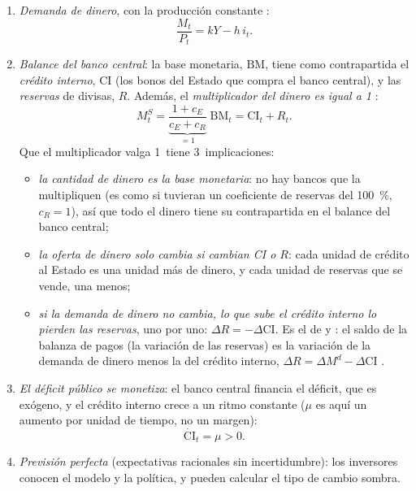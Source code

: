 \documentclass[11pt]{article}
\begin{document}
\begin{itemize}
\begin{enumerate}
\begin{equation}
    i_t=i^*+\frac{\dot E_t}{E_t} .
    \end{equation}
  \item \emph{Demanda de dinero}, con la producción constante :
    \begin{equation}\label{eq:demanda-fg}
    \frac{M_t}{P_t}=kY-h\,i_t .
    \end{equation}
  \item \emph{Balance del banco central}: la base monetaria, $\mathrm{BM}$, tiene como contrapartida el \emph{crédito interno}, CI (los bonos del Estado que compra el banco central), y las \emph{reservas} de divisas, $R$. Además, el \emph{multiplicador del dinero es igual a 1} :
    \begin{equation}\label{eq:balance-bc}
    M^S_t=\underbrace{\frac{1+c_E}{c_E+c_R}}_{=1}\;\mathrm{BM}_t=\mathrm{CI}_t+R_t .
    \end{equation}
    Que el multiplicador valga 1~tiene 3~implicaciones:
    \begin{itemize}
    \item \emph{la cantidad de dinero es la base monetaria}: no hay bancos que la multipliquen (es como si tuvieran un coeficiente de reservas del 100~\%, $c_R=1$), así que todo el dinero tiene su contrapartida en el balance del banco central;
    \item \emph{la oferta de dinero solo cambia si cambian CI o $R$}: cada unidad de crédito al Estado es una unidad más de dinero, y cada unidad de reservas que se vende, una menos;
    \item \emph{si la demanda de dinero no cambia, lo que sube el crédito interno lo pierden las reservas}, uno por uno: $\Delta R=-\Delta\mathrm{CI}$. Es el  de  y : el saldo de la balanza de pagos (la variación de las reservas) es la variación de la demanda de dinero menos la del crédito interno, $\Delta R=\Delta M^d-\Delta\mathrm{CI}$ .
    \end{itemize}
  \item \emph{El déficit público se monetiza}: el banco central financia el déficit, que es exógeno, y el crédito interno crece a un ritmo constante ($\mu$ es aquí un aumento por unidad de tiempo, no un margen):
    \begin{equation}\label{eq:credito-fg}
    \dot{\mathrm{CI}}_t=\mu>0 .
    \end{equation}
  \item \emph{Previsión perfecta} (expectativas racionales sin incertidumbre): los inversores conocen el modelo y la política, y pueden calcular el tipo de cambio sombra.
  \end{enumerate}
\end{itemize}
\end{document}
